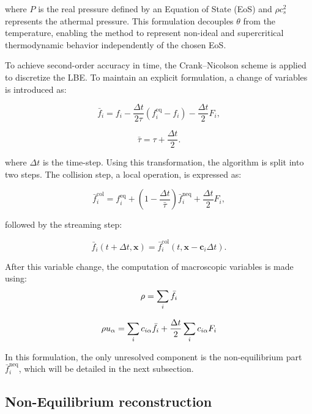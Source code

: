 where \( P \) is the real pressure defined by an Equation of State (EoS) and \( \rho c_s^2 \) represents the athermal pressure. This formulation decouples \( \theta \) from the temperature, enabling the method to represent non-ideal and supercritical thermodynamic behavior independently of the chosen EoS.



To achieve second-order accuracy in time, the Crank--Nicolson scheme is applied to discretize the LBE. To maintain an explicit formulation, a change of variables is introduced as:

\begin{equation}
    \bar{f}_i = f_i - \frac{\Delta t}{2\tau}(f_i^{\mathrm{eq}} - f_i) - \frac{\Delta t}{2} F_i,
\end{equation}

\begin{equation}
    \bar{\tau} = \tau + \frac{\Delta t}{2}.
\end{equation}

where $\Delta t$ is the time-step. Using this transformation, the algorithm is split into two steps. The collision step, a local operation, is expressed as:

\begin{equation}
    \bar{f}_i^{\mathrm{col}} = f_i^{\mathrm{eq}} + \left(1 - \frac{\Delta t}{\bar{\tau}}\right) \bar{f}_i^{\mathrm{neq}} + \frac{\Delta t}{2} F_i,
\end{equation}

followed by the streaming step:

\begin{equation}
    \bar{f}_i(t + \Delta t, \mathbf{x}) = \bar{f}_i^{\mathrm{col}}(t, \mathbf{x} - \mathbf{c}_i \Delta t).
\end{equation}

After this variable change, the computation of macroscopic variables is made using:
\begin{equation}
    \rho = \sum_i \Bar{f}_i
\end{equation}

\begin{equation}
    \rho u_\alpha= \sum_i c_{i\alpha}\Bar{f}_i + \frac{\Delta t}{2}\sum_i c_{i\alpha}F_i
\end{equation}

In this formulation, the only unresolved component is the non-equilibrium part $\bar{f}_i^{\mathrm{neq}}$, which will be detailed in the next subsection.


\subsection{Non-Equilibrium reconstruction}

